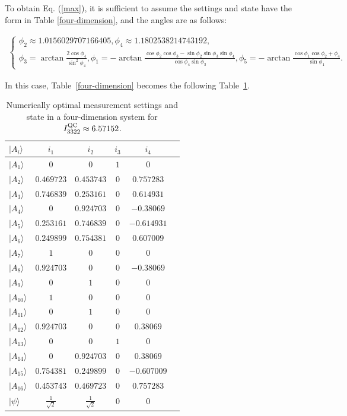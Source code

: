 \documentclass[pra,aps,notitlepage,superscriptaddress,showpacs,showkeys]{revtex4-1}
\theoremstyle{definition}
\theoremstyle{remark}
\begin{document}
To obtain Eq. (\ref{max}), it is sufficient to assume the settings and state have the form in Table \ref{four-dimension}, and the angles are as follows:
\begin{widetext}
\begin{eqnarray}
\left\{
  \begin{array}{ll}
    \phi_{2}\approx 1.0156029707166405,\phi_{4}\approx 1.1802538214743192,\\
    \phi_{3}=\arctan{\frac{2\cos{\phi_4}}{\sin^2{\phi_4}}},
\phi_{1}=-\arctan{\frac{\cos{\phi_2}\cos{\phi_3}-\sin{\phi_2}\sin{\phi_3}\sin{\phi_4}}{\cos{\phi_4}\sin{\phi_3}}},
\phi_{5}=-\arctan{\frac{\cos{\phi_1}\cos{\phi_2+\phi_4}}{\sin{\phi_1}}}.
\end{array}
\right.
\end{eqnarray}
\end{widetext}
In this case, Table~\ref{four-dimension} becomes the following Table~\ref{four-dimension-b}.

\begin{table}[t]
\caption{Numerically optimal measurement settings and state in a four-dimension system for $I_{3322}^{\rm QC}\approx6.57152$.}
\label{numerica3}
\centering
  \begin{tabular}{lccccc}
  \hline \hline
$|A_i\rangle$ & $i_1$ & $i_2$ & $i_3$ & $i_4$  \\
\hline
$|A_1\rangle$ & $0$ & $0$ & $1$ & $0$  \\
$|A_2\rangle$  & $0.469723$ & $0.453743$ & $0$ & $0.757283$  \\
$|A_3\rangle$ & $0.746839$ & $0.253161$ & $0$ & $0.614931$  \\
$|A_4\rangle$  & $0$ & $0.924703$ & $0$ & $-0.38069$  \\
$|A_5\rangle$ & $0.253161$ & $0.746839$ & $0$ & $-0.614931$  \\
$|A_6\rangle$ & $0.249899$ & $0.754381$ & $0$ & $0.607009$  \\
$|A_7\rangle$ & $1$ & $0$ & $0$ & $0$  \\
$|A_8\rangle$  & $0.924703$ & $0$ & $0$ & $-0.38069$  \\
$|A_9\rangle$  & $0$ & $1$ & $0$ & $0$  \\
$|A_{10}\rangle$  & $1$ & $0$ & $0$ & $0$ \\
$|A_{11}\rangle$ & $0$ & $1$ & $0$ & $0$  \\
$|A_{12}\rangle$  & $0.924703$ & $0$ & $0$ & $0.38069$  \\
$|A_{13}\rangle$  & $0$ & $0$ & $1$ & $0$  \\
$|A_{14}\rangle$  & $0$ & $0.924703$ & $0$ & $0.38069$  \\
$|A_{15}\rangle$ & $0.754381$ & $0.249899$ & $0$ & $-0.607009$  \\
$|A_{16}\rangle$  & $0.453743$ & $0.469723$ & $0$ & $0.757283$  \\
\hline
$|\psi\rangle$ & $\frac{1}{\sqrt{2}}$ & $\frac{1}{\sqrt{2}}$ & $0$ & $0$\\
 \hline \hline
   \end{tabular}
\label{four-dimension-b}
\end{table}
\end{document}
